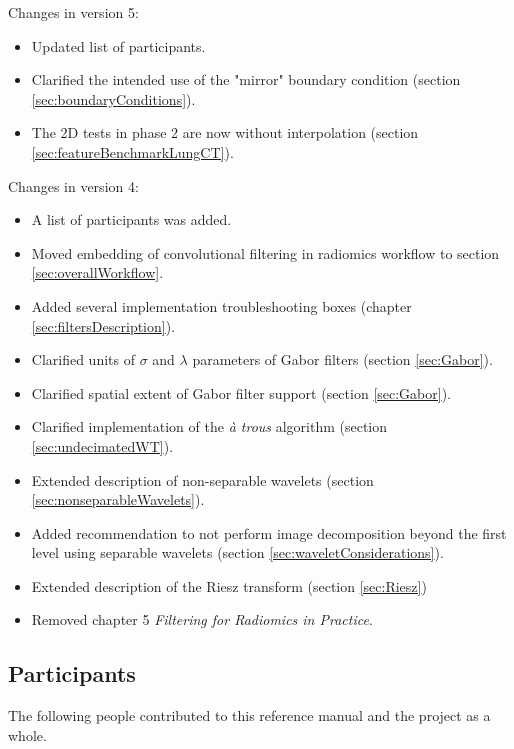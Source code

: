 \documentclass[fleqn,a4paper,oneside,openany]{book}
\renewcommand{\marginnote}[2][]{}
\begin{document}
\noindent Changes in version 5:
\begin{itemize}
    \item Updated list of participants.
    \item Clarified the intended use of the "mirror" boundary condition (section \ref{sec:boundaryConditions}).
    \item The 2D tests in phase 2 are now without interpolation (section \ref{sec:featureBenchmarkLungCT}).
\end{itemize}

\noindent Changes in version 4:
\begin{itemize}
    \item A list of participants was added.
    \item Moved embedding of convolutional filtering in radiomics workflow to section \ref{sec:overallWorkflow}.
    \item Added several implementation troubleshooting boxes (chapter \ref{sec:filtersDescription}).
    \item Clarified units of $\sigma$ and $\lambda$ parameters of Gabor filters (section \ref{sec:Gabor}).
    \item Clarified spatial extent of Gabor filter support (section \ref{sec:Gabor}).
    \item Clarified implementation of the \emph{\`{a} trous} algorithm (section \ref{sec:undecimatedWT}).
    \item Extended description of non-separable wavelets (section \ref{sec:nonseparableWavelets}).
    \item Added recommendation to not perform image decomposition beyond the first level using separable wavelets (section \ref{sec:waveletConsiderations}).
    \item Extended description of the Riesz transform (section \ref{sec:Riesz})
    \item Removed chapter 5 \emph{Filtering for Radiomics in Practice}.
\end{itemize}

\subsection*{Participants}
\marginnote{\footnotesize v4: Added list of participants. v5: updated list. v6: updated list. v8: updated list to reflect manuscript}
The following people contributed to this reference manual and the project as a whole.
\end{document}
